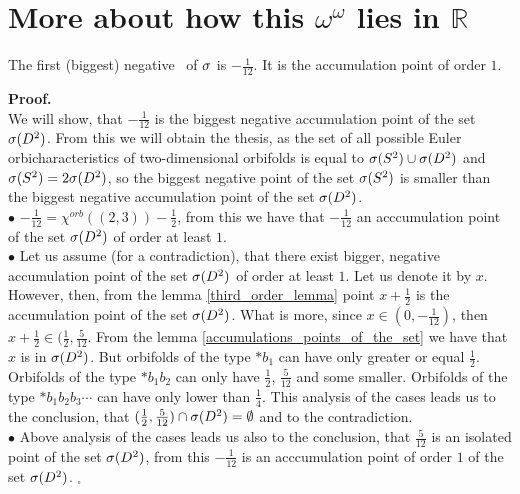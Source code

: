 \section{More about how this $\omega^\omega$ lies in $\mathbb{R}$}
\begin{observation}
The first (biggest) negative \apots\ of ${\sigma}$ is 
$-\frac{1}{12}$. It is the accumulation point of order $1$. 
\end{observation}
\noindent\textbf{Proof.} \\
We will show, that $-\frac{1}{12}$ is the biggest negative accumulation point of the set ${{\sigma}(D^2)}$. 
From this we will obtain the thesis, as the set of all possible Euler orbicharacteristics 
of two-dimensional orbifolds is equal to ${{\sigma}(S^2)} \cup {{\sigma}(D^2)}$ and ${{\sigma}(S^2)} = 2{{\sigma}(D^2)}$, so 
the biggest negative point of the set ${{\sigma}(S^2)}$ is smaller than the biggest negative accumulation 
point of the set ${{\sigma}(D^2)}$. \\
$\bullet$ $-\frac{1}{12}=\chi^{orb}((2,3))-\frac{1}{2}$, from this we have that $-\frac{1}{12}$ 
an acccumulation point of the set ${{\sigma}(D^2)}$ of order at least $1$. \\
$\bullet$ Let us assume (for a contradiction), that there exist bigger, negative 
accumulation point of the set ${{\sigma}(D^2)}$ of order at least $1$. Let us denote it by $x$. \\
However, then, from the lemma \ref{third_order_lemma} point $x+\frac{1}{2}$ is the accumulation 
point of the set ${{\sigma}(D^2)}$. What is more, since $x\in (0, -\frac{1}{12})$, then $x+\frac{1}{2} 
\in (\frac{1}{2}, \frac{5}{12}$. From the lemma \ref{accumulations_points_of_the_set} we 
have that $x$ is in ${{\sigma}(D^2)}$. But orbifolds of the type $\ast b_1$ can have \Eoc only greater or 
equal $\frac{1}{2}$. Orbifolds of the type $\ast b_1b_2$ can only have \Eoc $\frac{1}{2}$, 
$\frac{5}{12}$ and some smaller. Orbifolds of the type $\ast b_1b_2b_3\cdots$ can have \Eoc only 
lower than $\frac{1}{4}$. This analysis of the cases leads us to the conclusion, that 
$(\frac{1}{2},\frac{5}{12})\cap {{\sigma}(D^2)}=\emptyset$ and to the contradiction. \\
$\bullet$ Above analysis of the cases leads us also to the conclusion, that $\frac{5}{12}$ 
is 
an isolated point of the set ${{\sigma}(D^2)}$, from this $-\frac{1}{12}$ is an acccumulation point 
of order $1$ of the set ${{\sigma}(D^2)}$. $_\square$ \\ 
 









